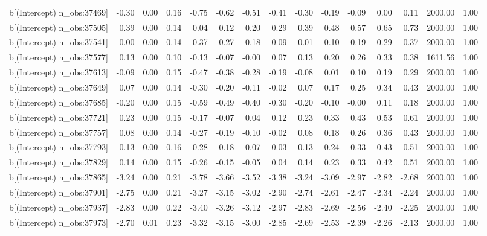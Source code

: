 \begin{table}[ht]
\begin{tabular}{rrrrrrrrrrrrrrr}
  b[(Intercept) n\_obs:37469] & -0.30 & 0.00 & 0.16 & -0.75 & -0.62 & -0.51 & -0.41 & -0.30 & -0.19 & -0.09 & 0.00 & 0.11 & 2000.00 & 1.00 \\ 
  b[(Intercept) n\_obs:37505] & 0.39 & 0.00 & 0.14 & 0.04 & 0.12 & 0.20 & 0.29 & 0.39 & 0.48 & 0.57 & 0.65 & 0.73 & 2000.00 & 1.00 \\ 
  b[(Intercept) n\_obs:37541] & 0.00 & 0.00 & 0.14 & -0.37 & -0.27 & -0.18 & -0.09 & 0.01 & 0.10 & 0.19 & 0.29 & 0.37 & 2000.00 & 1.00 \\ 
  b[(Intercept) n\_obs:37577] & 0.13 & 0.00 & 0.10 & -0.13 & -0.07 & -0.00 & 0.07 & 0.13 & 0.20 & 0.26 & 0.33 & 0.38 & 1611.56 & 1.00 \\ 
  b[(Intercept) n\_obs:37613] & -0.09 & 0.00 & 0.15 & -0.47 & -0.38 & -0.28 & -0.19 & -0.08 & 0.01 & 0.10 & 0.19 & 0.29 & 2000.00 & 1.00 \\ 
  b[(Intercept) n\_obs:37649] & 0.07 & 0.00 & 0.14 & -0.30 & -0.20 & -0.11 & -0.02 & 0.07 & 0.17 & 0.25 & 0.34 & 0.43 & 2000.00 & 1.00 \\ 
  b[(Intercept) n\_obs:37685] & -0.20 & 0.00 & 0.15 & -0.59 & -0.49 & -0.40 & -0.30 & -0.20 & -0.10 & -0.00 & 0.11 & 0.18 & 2000.00 & 1.00 \\ 
  b[(Intercept) n\_obs:37721] & 0.23 & 0.00 & 0.15 & -0.17 & -0.07 & 0.04 & 0.12 & 0.23 & 0.33 & 0.43 & 0.53 & 0.61 & 2000.00 & 1.00 \\ 
  b[(Intercept) n\_obs:37757] & 0.08 & 0.00 & 0.14 & -0.27 & -0.19 & -0.10 & -0.02 & 0.08 & 0.18 & 0.26 & 0.36 & 0.43 & 2000.00 & 1.00 \\ 
  b[(Intercept) n\_obs:37793] & 0.13 & 0.00 & 0.16 & -0.28 & -0.18 & -0.07 & 0.03 & 0.13 & 0.24 & 0.33 & 0.43 & 0.51 & 2000.00 & 1.00 \\ 
  b[(Intercept) n\_obs:37829] & 0.14 & 0.00 & 0.15 & -0.26 & -0.15 & -0.05 & 0.04 & 0.14 & 0.23 & 0.33 & 0.42 & 0.51 & 2000.00 & 1.00 \\ 
  b[(Intercept) n\_obs:37865] & -3.24 & 0.00 & 0.21 & -3.78 & -3.66 & -3.52 & -3.38 & -3.24 & -3.09 & -2.97 & -2.82 & -2.68 & 2000.00 & 1.00 \\ 
  b[(Intercept) n\_obs:37901] & -2.75 & 0.00 & 0.21 & -3.27 & -3.15 & -3.02 & -2.90 & -2.74 & -2.61 & -2.47 & -2.34 & -2.24 & 2000.00 & 1.00 \\ 
  b[(Intercept) n\_obs:37937] & -2.83 & 0.00 & 0.22 & -3.40 & -3.26 & -3.12 & -2.97 & -2.83 & -2.69 & -2.56 & -2.40 & -2.25 & 2000.00 & 1.00 \\ 
  b[(Intercept) n\_obs:37973] & -2.70 & 0.01 & 0.23 & -3.32 & -3.15 & -3.00 & -2.85 & -2.69 & -2.53 & -2.39 & -2.26 & -2.13 & 2000.00 & 1.00 \\ 

\end{tabular}
\end{table}
